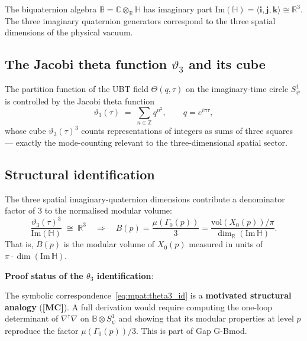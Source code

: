 \documentclass[12pt,a4paper]{article}
\theoremstyle{definition}
\theoremstyle{remark}
\newcommand{\BB}{\mathbb{B}}
\newcommand{\CC}{\mathbb{C}}
\newcommand{\RR}{\mathbb{R}}
\newcommand{\HH}{\mathbb{H}}
\newcommand{\ZZ}{\mathbb{Z}}
\newcommand{\vth}{\vartheta}
\newcommand{\MC}{\textbf{[MC]}}
\begin{document}
The biquaternion algebra $\BB = \CC \otimes_\RR \HH$ has imaginary part
$\mathrm{Im}(\HH) = \langle \mathbf{i}, \mathbf{j}, \mathbf{k} \rangle \cong \RR^3$.
The three imaginary quaternion generators correspond to the three spatial
dimensions of the physical vacuum.

\subsection{The Jacobi theta function $\vth_3$ and its cube}

The partition function of the UBT field $\Theta(q, \tau)$ on the imaginary-time
circle $S^1_\psi$ is controlled by the Jacobi theta function
\begin{equation}
  \vth_3(\tau)
  \;=\;
  \sum_{n \in \ZZ} q^{n^2},
  \qquad q = e^{i\pi\tau},
  \label{eq:mpat:theta3}
\end{equation}
whose cube $\vth_3(\tau)^3$ counts representations of integers as sums of three
squares — exactly the mode-counting relevant to the three-dimensional spatial
sector.

\subsection{Structural identification}

The three spatial imaginary-quaternion dimensions contribute a denominator factor
of 3 to the normalised modular volume:
\begin{equation}
  \frac{\vth_3(\tau)^3}{\mathrm{Im}(\HH)}
  \;\cong\;
  \RR^3
  \quad\Longrightarrow\quad
  B(p)
  = \frac{\mu(\Gamma_0(p))}{3}
  = \frac{\mathrm{vol}(X_0(p))/\pi}{\dim_\RR(\mathrm{Im}\,\HH)}.
  \label{eq:mpat:theta3_id}
\end{equation}
That is, $B(p)$ is the modular volume of $X_0(p)$ measured in units of
$\pi \cdot \dim(\mathrm{Im}\,\HH)$.

\begin{infobox}
\textbf{Proof status of the $\theta_3$ identification}:

The symbolic correspondence~\eqref{eq:mpat:theta3_id} is a \textbf{motivated
structural analogy} (\MC).  A full derivation would require computing the
one-loop determinant of $\nabla^\dagger\nabla$ on $\BB \otimes S^1_\psi$ and
showing that its modular properties at level $p$ reproduce the factor
$\mu(\Gamma_0(p))/3$.  This is part of Gap G-Bmod.
\end{infobox}

\end{document}
